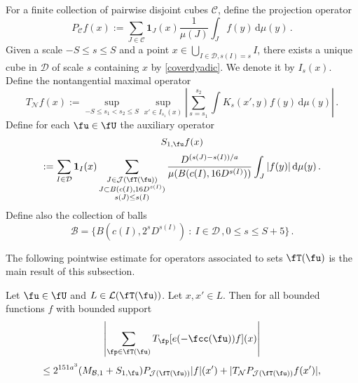 For a finite collection of pairwise disjoint cubes $\mathcal{C}$, define the projection operator
$$
    P_{\mathcal{C}}f(x) :=\sum_{J\in\mathcal{C}}\mathbf{1}_J(x) \frac{1}{\mu(J)}\int_J f(y) \, \mathrm{d}\mu(y)\,.
$$
Given a scale $-S \le s\le S$ and a point $x \in \bigcup_{I\in \mathcal{D}, s(I) = s} I$, there exists a unique cube in $\mathcal{D}$ of scale $s$ containing $x$ by \eqref{coverdyadic}. We denote it by $I_s(x)$. Define the nontangential maximal operator
\begin{equation}
    \label{eq-TN-def}
    T_{\mathcal{N}} f(x) := \sup_{-S \le s_1 < s_2 \le S} \sup_{x' \in I_{s_1}(x)} \left| \sum_{s = s_1}^{s_2} \int K_s(x',y) f(y) \, \mathrm{d}\mu(y) \right|\,.
\end{equation}
Define for each $\fu \in \fU$ the auxiliary operator
$$
    S_{1,\fu}f(x)
$$
\begin{equation}
    \label{eq-def-S-op}
    :=\sum_{I\in\mathcal{D}} \mathbf{1}_{I}(x) \sum_{\substack{J\in \mathcal{J}(\fT(\fu))\\
    J\subset B(c(I), 16 D^{s(I)})\\ s(J) \le s(I)}} \frac{D^{(s(J) - s(I))/a}}{\mu(B(c(I), 16D^{s(I)}))}\int_J |f(y)| \, \mathrm{d}\mu(y)\,.
\end{equation}
Define also the collection of balls
$$
    \mathcal{B} = \{B(c(I), 2^s D^{s(I)}) \ : \ I \in \mathcal{D}\,, 0 \le s \le S + 5\}\,.
$$

The following pointwise estimate for operators associated to sets $\fT(\fu)$ is the main result of this subsection.

\begin{lemma}
    \label{pointwise-tree-estimate}
    Let $\fu \in \fU$ and $L \in \mathcal{L}(\fT(\fu))$. Let $x, x' \in L$.
    Then for all bounded functions $f$ with bounded support
    $$
        \left|\sum_{\fp \in \fT(\fu)} T_{\fp}[ e(-\fcc(\fu))f](x)\right|
    $$
    \begin{equation}
        \label{eq-LJ-ptwise}
        \leq 2^{151a^3}(M_{\mathcal{B},1}+S_{1,\fu})P_{\mathcal{J}(\fT(\fu))}|f|(x')+|T_{\mathcal{N}}P_{\mathcal{J}(\fT(\fu))}f(x')|,
    \end{equation}
\end{lemma}


